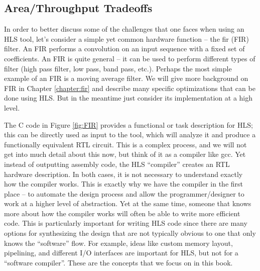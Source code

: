 
\subsection{Area/Throughput Tradeoffs}
\label{sec:filterThroughputTradeoffs}

In order to better discuss some of the challenges that one faces when using an HLS tool, let's consider a simple yet common hardware function -- the \gls{fir} (FIR) filter. An FIR performs a convolution on an input sequence with a fixed set of coefficients. An FIR is quite general -- it can be used to perform different types of filter (high pass filter, low pass, band pass, etc.).  Perhaps the most simple example of an FIR is a moving average filter. We will give more background on FIR in Chapter \ref{chapter:fir} and describe many specific optimizations that can be done using HLS. But in the meantime just consider its implementation at a high level. 

The C code in Figure \ref{fig:FIR} provides a functional or task description for HLS; this can be directly used as input to the \VHLS tool, which will analyze it and  produce a functionally equivalent RTL circuit. This is a complex process, and we will not get into much detail about this now, but think of it as a compiler like gcc. Yet instead of outputting assembly code, the HLS ``compiler'' creates an RTL hardware description. In both cases, it is not necessary to understand exactly how the compiler works. This is exactly why we have the compiler in the first place -- to automate the design process and allow the programmer/designer to work at a higher level of abstraction. Yet at the same time, someone that knows more about how the compiler works will often be able to write more efficient code. This is particularly important for writing HLS code since there are many options for synthesizing the design that are not typically obvious to one that only knows the ``software'' flow. For example, ideas like custom memory layout, pipelining, and different I/O interfaces are important for HLS, but not for a ``software compiler''. These are the concepts that we focus on in this book.

